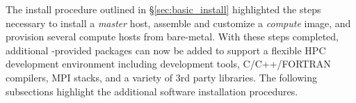 The install procedure outlined in \S\ref{sec:basic_install} highlighted the
steps necessary to install a {\em master} host, assemble and customize a {\em
  compute} image, and provision several compute hosts from bare-metal. With
these steps completed, additional \OHPC{}-provided packages can now be added to
support a flexible HPC development environment including development tools,
C/C++/FORTRAN compilers, MPI stacks, and a variety of 3rd party libraries. The
following subsections highlight the additional software installation
procedures.

